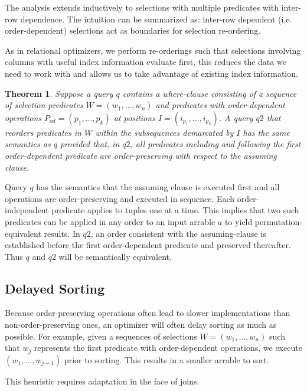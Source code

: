 \documentclass{acm_proc_article-sp}
\let\proof\relax
\let\endproof\relax
\newenvironment{proofsketch}{%
  \renewcommand{\proofname}{Proof Sketch}\proof}{\endproof}
\newtheorem{theorem}{Theorem}[section]
\begin{document}
The analysis extends inductively to selections with multiple predicates with inter-row dependence. The intuition can be summarized as: inter-row dependent (i.e. order-dependent)  selections act as boundaries for selection re-ordering.

As in relational optimizers,
we perform re-orderings such that selections involving columns with useful index information evaluate first, this reduces the data we need to work with and allows us to take advantage of existing index information.

\begin{theorem}
Suppose a query $q$ contains a where-clause consisting of a 
sequence of selection predicates $W = (w_1, ..., w_n)$ 
and predicates with order-dependent
operations $P_{od} = (p_1, ..., p_k)$ at positions $I=(i_{p_1}, ..., i_{p_k})$. 
A query $q2$ that reorders  predicates in $W$
within the subsequences demarcated by
$I$ has the same semantics as $q$ provided that, in $q2$, 
all predicates including
and following
the first order-dependent predicate are order-preserving with respect
to the assuming clause.
\label{selection-reorder-theorem}
\end{theorem}

\begin{proofsketch}
Query $q$ has the semantics that the assuming clause is executed first and
all operations are order-preserving and executed in sequence.
Each order-independent predicate applies to tuples one at a time.
This implies that two such predicates can be applied in any order to 
an input arrable $a$ to yield 
permutation-equivalent results.
In $q2$, an order consistent with the assuming-clause is established before the first order-dependent predicate
and preserved thereafter.
Thus $q$ and $q2$ will be semantically equivalent.
\end{proofsketch}


\subsection{Delayed Sorting}
Because order-preserving operations often lead to slower implementations
than non-order-preserving ones, an optimizer will often 
delay sorting as much as possible.
For example, given a sequences of selections $W = (w_1, ... , w_n)$ such that $w_j$ represents the first predicate with order-dependent operations, we execute $(w_1, ..., w_{j-1})$ prior to sorting. This results in a smaller arrable to sort. 

This heuristic requires adaptation in the face of joins. 
\end{document}
